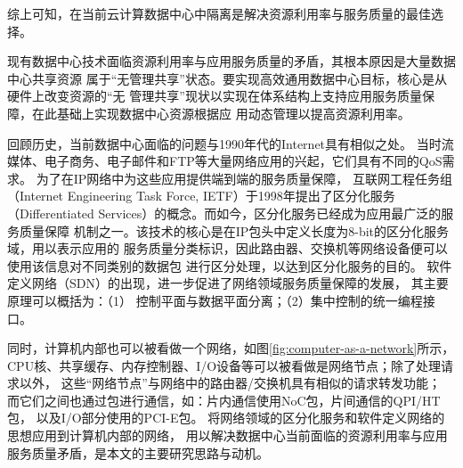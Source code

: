 综上可知，在当前云计算数据中心中隔离是解决资源利用率与服务质量的最佳选择。



现有数据中心技术面临资源利用率与应用服务质量的矛盾，其根本原因是大量数据中心共享资源
属于“无管理共享”状态。要实现高效通用数据中心目标，核心是从硬件上改变资源的“无
管理共享”现状以实现在体系结构上支持应用服务质量保障，在此基础上实现数据中心资源根据应
用动态管理以提高资源利用率。

回顾历史，当前数据中心面临的问题与1990年代的Internet具有相似之处。
当时流媒体、电子商务、电子邮件和FTP等大量网络应用的兴起，它们具有不同的QoS需求。
为了在IP网络中为这些应用提供端到端的服务质量保障，
互联网工程任务组（Internet Engineering Task Force, IETF）于1998年提出了区分化服务
（Differentiated Services）的概念。而如今，区分化服务已经成为应用最广泛的服务质量保障
机制之一。该技术的核心是在IP包头中定义长度为8-bit的区分化服务域，用以表示应用的
服务质量分类标识，因此路由器、交换机等网络设备便可以使用该信息对不同类别的数据包
进行区分处理，以达到区分化服务的目的。
软件定义网络（SDN）的出现，进一步促进了网络领域服务质量保障的发展，
其主要原理可以概括为：（1） 控制平面与数据平面分离；（2）集中控制的统一编程接口。

同时，计算机内部也可以被看做一个网络，如图\ref{fig:computer-as-a-network}所示，
CPU核、共享缓存、内存控制器、I/O设备等可以被看做是网络节点；除了处理请求以外，
这些“网络节点”与网络中的路由器/交换机具有相似的请求转发功能；
而它们之间也通过包进行通信，如：片内通信使用NoC包，片间通信的QPI/HT包，
以及I/O部分使用的PCI-E包。
将网络领域的区分化服务和软件定义网络的思想应用到计算机内部的网络，
用以解决数据中心当前面临的资源利用率与应用服务质量矛盾，是本文的主要研究思路与动机。
